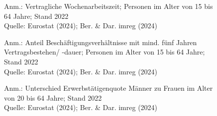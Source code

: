 \begin{figure}[p]
	{\centering {}}
	\label{map:zeit}
	\begin{spacing}{1} \scriptsize
		Anm.: Vertragliche Wochenarbeitszeit; Personen im Alter von 15 bis 64 Jahre; Stand 2022\\
		Quelle: Eurostat (2024); Ber. \& Dar. imreg (2024) \end{spacing}
\end{figure}


\begin{figure}[p]
	{\centering {}}
	\label{map:lang}
	\begin{spacing}{1} \scriptsize
		Anm.: Anteil Beschäftigungsverhältnisse mit mind. fünf Jahren Vertragsbestehen/ -dauer; Personen im Alter von 15 bis 64 Jahre; Stand 2022\\
		Quelle: Eurostat (2024); Ber. \& Dar. imreg (2024) \end{spacing}
\end{figure}


\begin{figure}[p]
	{\centering {}}
	\label{map:geschlecht}
	\begin{spacing}{1} \scriptsize
		Anm.: Unterschied Erwerbstätigenquote Männer zu Frauen im Alter von 20 bis 64 Jahre; Stand 2022\\
		Quelle: Eurostat (2024); Ber. \& Dar. imreg (2024) \end{spacing}
\end{figure}
